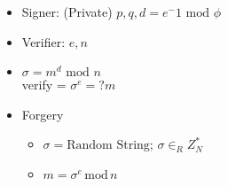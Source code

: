 \begin{itemize}
\begin{itemize}
\begin{itemize}
        \item Signer: (Private) $p, q, d = e^-1 \text{ mod } \phi$
        \item Verifier: $e,n$
        \item $\sigma = m^d \text{ mod } n$
        \\verify = $\sigma^e =? m$
        \item Forgery
            \begin{itemize}
            \item $\sigma = \text{Random String}$; $\sigma \in_R Z_N^*$
            \item $m = \sigma^e\,\text{mod}\,n$
            \end{itemize}
        \end{itemize}
    \end{itemize}
\end{itemize}
